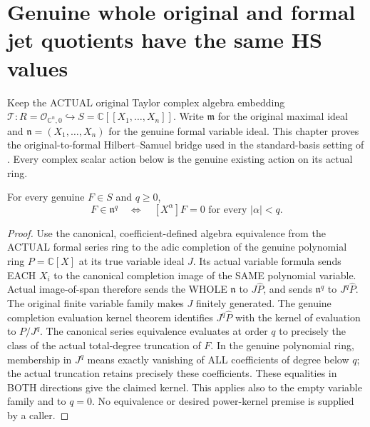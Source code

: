 \section{Genuine whole original and formal jet quotients have the same HS values}

Keep the ACTUAL original Taylor complex algebra embedding
$\mathcal T:R=\mathcal O_{\mathbb C^n,0}\hookrightarrow
S=\mathbb C[[X_1,\ldots,X_n]]$. Write $\mathfrak m$ for the original
maximal ideal and $\mathfrak n=(X_1,\ldots,X_n)$ for the genuine formal
variable ideal. This chapter proves the original-to-formal Hilbert--Samuel
bridge used in the standard-basis setting of
\cite[\S7, pp.~260--271]{bierstone-milman97-invent-math}. Every complex
scalar action below is the genuine existing action on its actual ring.

\begin{lemma}
\label{hir:actual-formal-variable-power-coefficient-kernel}
For every genuine $F\in S$ and $q\ge0$,
\[
 F\in\mathfrak n^q\quad\Longleftrightarrow\quad
 [X^\alpha]F=0\text{ for every }|\alpha|<q.
\]
\leanok
\end{lemma}
\begin{proof}
Use the canonical, coefficient-defined algebra equivalence from the
ACTUAL formal series ring to the adic completion of the genuine polynomial
ring $P=\mathbb C[X]$ at its true variable ideal $J$. Its actual variable
formula sends EACH $X_i$ to the canonical completion image of the SAME
polynomial variable. Actual image-of-span therefore sends the WHOLE
$\mathfrak n$ to $J\widehat P$, and sends $\mathfrak n^q$ to
$J^q\widehat P$. The original finite variable family makes $J$ finitely
generated. The genuine completion evaluation kernel theorem identifies
$J^q\widehat P$ with the kernel of evaluation to $P/J^q$.
The canonical series equivalence evaluates at order $q$ to precisely the
class of the actual total-degree truncation of $F$. In the genuine
polynomial ring, membership in $J^q$ means exactly vanishing of ALL
coefficients of degree below $q$; the actual truncation retains precisely
these coefficients. These equalities in BOTH directions give the claimed
kernel. This applies also to the empty variable family and to $q=0$.
No equivalence or desired power-kernel premise is supplied by a caller.
\end{proof}

